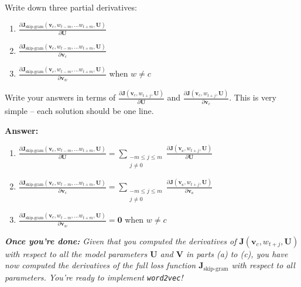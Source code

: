\documentclass{article}
\newenvironment{answer}{
        {\bf Answer:} \sf \begingroup\color{red}
    }{\endgroup}%
\begin{document}
\begin{enumerate}
        Write down three partial derivatives:
        \begin{enumerate}
            [label=(\roman*)]
            \item ${\frac{\partial \bm J_{\textrm{skip-gram}}(\bm v_c, w_{t-m},\ldots w_{t+m}, \bm U)} {\partial \bm U}}$
            \item ${\frac{\partial \bm J_{\textrm{skip-gram}}(\bm v_c, w_{t-m},\ldots w_{t+m}, \bm U)} {\partial \bm v_c}}$
            \item ${\frac{\partial \bm J_{\textrm{skip-gram}}(\bm v_c, w_{t-m},\ldots w_{t+m}, \bm U)} {\partial \bm v_w}}$ when $w \ne c$
        \end{enumerate}
        Write your answers in terms of ${\frac{\partial \bm J(\bm v_c, w_{t+j}, \bm U)}{\partial \bm U}}$ and ${\frac{\partial \bm J(\bm v_c, w_{t+j}, \bm U)}{\partial \bm v_c}}$. This is very simple -- each solution should be one line.

        \begin{shaded}
            \begin{answer}
                \begin{enumerate}
                    [label=(\roman*)]
                    \item ${\frac{\partial \bm J_{\textrm{skip-gram}}(\bm v_c, w_{t-m},\ldots w_{t+m}, \bm U)} {\partial \bm U}} = \sum_{\substack{-m \le j \le m \\ j \ne 0}} \frac{\partial \bm{J} (\bm{v_c},w_{t+j},\bm{U})}{\partial \bm{U}}  $
                    \item ${\frac{\partial \bm J_{\textrm{skip-gram}}(\bm v_c, w_{t-m},\ldots w_{t+m}, \bm U)} {\partial \bm v_c}} = \sum_{\substack{-m \le j \le m \\ j \ne 0}} \frac{\partial \bm{J} (\bm{v_c},w_{t+j},\bm{U})}{\partial \bm{v_c}}  $
                    \item ${\frac{\partial \bm J_{\textrm{skip-gram}}(\bm v_c, w_{t-m},\ldots w_{t+m}, \bm U)} {\partial \bm v_w}} = \bm 0$ when $w \ne c$
                \end{enumerate}
            \end{answer}
        \end{shaded}

        \textit{\textbf{Once you're done:} Given that you computed the derivatives of $\bm J(\bm v_c, w_{t+j}, \bm U)$ with respect to all the model parameters $\bm U$ and $\bm V$ in parts (a) to (c), you have now computed the derivatives of the full loss function $\bm J_{\text{skip-gram}}$ with respect to all parameters. You're ready to implement \texttt{word2vec}!} %

    \end{enumerate}
\end{document}

